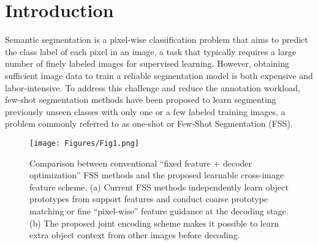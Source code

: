 \documentclass[conference]{IEEEtran}
\begin{document}
\section{Introduction}
Semantic segmentation is a pixel-wise classification problem that aims to predict the class label of each pixel in an image, a task that typically requires a large number of finely labeled images for supervised learning. However, obtaining sufficient image data to train a reliable segmentation model is both expensive and labor-intensive. To address this challenge and reduce the annotation workload, few-shot segmentation methods \cite{RN4, MLC, Part-aware-prototype} have been proposed to learn segmenting previously unseen classes with only one or a few labeled training images, a problem commonly referred to as one-shot or Few-Shot Segmentation (FSS).
\begin{figure}[t]

               \centering

               \texttt{[image: Figures/Fig1.png]}

               \caption{Comparison between conventional ``fixed feature + decoder optimization'' FSS methods and the proposed learnable cross-image feature scheme. (a) Current FSS methods independently learn object prototypes from support features and conduct coarse prototype matching or fine ``pixel-wise'' feature guidance at the decoding stage. (b) The proposed joint encoding scheme makes it possible to learn extra object context from other images before decoding.}

               \label{fig:fig1}

\end{figure}
\end{document}
